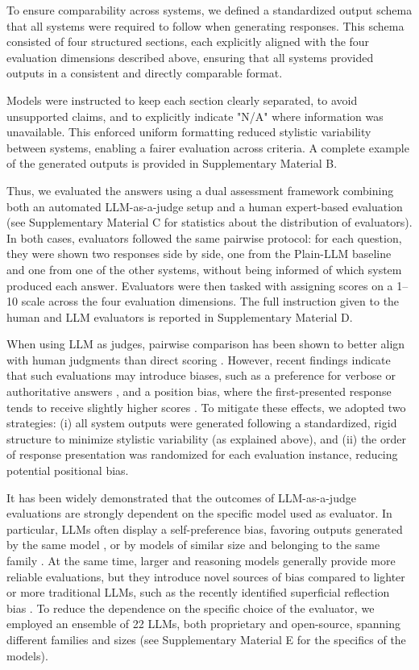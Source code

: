 To ensure comparability across systems, we defined a standardized output schema that all systems were required to follow when generating responses. 
This schema consisted of four structured sections, each explicitly aligned with the four evaluation dimensions described above, ensuring that all systems provided outputs in a consistent and directly comparable format.

Models were instructed to keep each section clearly separated, to avoid unsupported claims, and to explicitly indicate "N/A" where information was unavailable. This enforced uniform formatting reduced stylistic variability between systems, enabling a fairer evaluation across criteria. A complete example of the generated outputs is provided in Supplementary Material B.

Thus, we evaluated the answers using a dual assessment framework combining both an automated LLM-as-a-judge setup \citep{gu_survey_2025} and a human expert-based evaluation (see Supplementary Material C for statistics about the distribution of evaluators). In both cases, evaluators followed the same pairwise protocol: for each question, they were shown two responses side by side, one from the Plain-LLM baseline and one from one of the other systems, without being informed of which system produced each answer. Evaluators were then tasked with assigning scores on a 1–10 scale across the four evaluation dimensions. The full instruction given to the human and LLM evaluators is reported in Supplementary Material D.

When using LLM as judges, pairwise comparison has been shown to better align with human judgments than direct scoring \citep{liu_aligning_2025}. However, recent findings indicate that such evaluations may introduce biases, such as a preference for verbose or authoritative answers \citep{jeong_comparative_2025, wu_style_2023}, and a position bias, where the first-presented response tends to receive slightly higher scores \citep{shi_judging_2025}. To mitigate these effects, we adopted two strategies: (i) all system outputs were generated following a standardized, rigid structure to minimize stylistic variability (as explained above), and (ii) the order of response presentation was randomized for each evaluation instance, reducing potential positional bias.

It has been widely demonstrated that the outcomes of LLM-as-a-judge evaluations are strongly dependent on the specific model used as evaluator. In particular, LLMs often display a self-preference bias, favoring outputs generated by the same model \citep{wataoka_self-preference_2024}, or by models of similar size and belonging to the same family \citep{li_preference_2025}. At the same time, larger and reasoning models generally provide more reliable evaluations, but they introduce novel sources of bias compared to lighter or more traditional LLMs, such as the recently identified superficial reflection bias \citep{wang_assessing_2025}. To reduce the dependence on the specific choice of the evaluator, we employed an ensemble of 22 LLMs, both proprietary and open-source, spanning different families and sizes (see Supplementary Material E for the specifics of the models).


